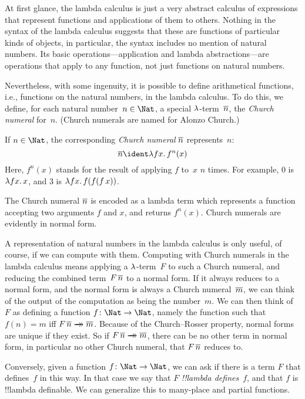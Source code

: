 \documentclass[../../../include/open-logic-section]{subfiles}
\begin{document}

At first glance, the lambda calculus is just a very abstract calculus
of expressions that represent functions and applications of them to
others. Nothing in the syntax of the lambda calculus suggests that
these are functions of particular kinds of objects, in particular, the
syntax includes no mention of natural numbers. Its basic
operations---application and lambda abstractions---are operations that
apply to any function, not just functions on natural
numbers.

Nevertheless, with some ingenuity, it is possible to define
arithmetical functions, i.e., functions on the natural numbers, in the
lambda calculus. To do this, we define, for each natural number~$n \in
\Nat$, a special $\lambd$-term~$\overline{n}$, the \emph{Church numeral}
for~$n$. (Church numerals are named for Alonzo Church.)

\begin{defn}
  If $n \in \Nat$, the corresponding \emph{Church numeral} $\overline{n}$
  represents~$n$:
  \[
    \num{n} \ident \lambd[fx][f^n(x)]
  \]
  Here, $f^n(x)$ stands for the result of applying $f$ to~$x$ $n$
  times. For example, $\num{0}$ is $\lambd[fx][x]$, and $\num{3}$ is
  $\lambd[fx][f(f(f\,x))]$.
\end{defn}
  
The Church numeral $\overline{n}$ is encoded as a lambda term which
represents a function accepting two arguments $f$ and $x$, and
returns $f^n(x)$. Church numerals are evidently in normal form.

A representation of natural numbers in the lambda calculus is only
useful, of course, if we can compute with them.  Computing with Church
numerals in the lambda calculus means applying a $\lambd$-term~$F$ to
such a Church numeral, and reducing the combined term~$F\, \overline{n}$ to
a normal form. If it always reduces to a normal form, and the normal
form is always a Church numeral~$\overline{m}$, we can think of the output
of the computation as being the number~$m$. We can then think of~$F$
as defining a function $f\colon \Nat \to \Nat$, namely the function
such that $f(n) = m$ iff $F\, \num n \red \num m$. Because of the
Church--Rosser property, normal forms are unique if they exist. So if
$F\, \num n \red \num m$, there can be no other term in normal form,
in particular no other Church numeral, that $F \, \overline{n}$ reduces to.

Conversely, given a function $f\colon \Nat \to \Nat$,
we can ask if there is a term $F$ that defines~$f$ in this way. In
that case we say that $F$ \emph{!!{lambda define}s}~$f$, and that $f$ is
!!{lambda definable}. We can generalize this to many-place and partial
functions.
\end{document}
